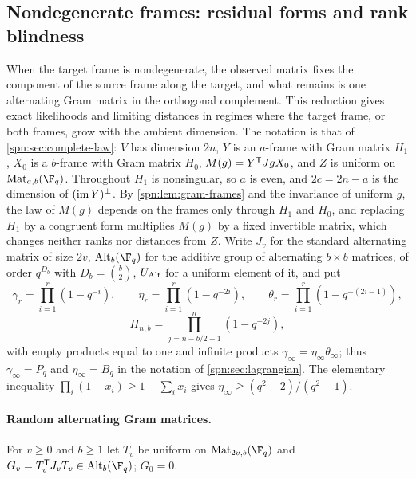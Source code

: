 \subsection{Nondegenerate frames: residual forms and rank blindness}\label{spn:sec:nondegenerate}

When the target frame is nondegenerate, the observed matrix fixes the component of the source
frame along the target, and what remains is one alternating Gram matrix in the orthogonal
complement. This reduction gives exact likelihoods and limiting distances in regimes where the
target frame, or both frames, grow with the ambient dimension. The notation is that of
\cref{spn:sec:complete-law}: $V$ has dimension $2n$, $Y$ is an $a$-frame with Gram matrix $H_1$,
$X_0$ is a $b$-frame with Gram matrix $H_0$, $M(g)=Y^{\mathsf{T}}JgX_0$, and $Z$ is uniform on
$\spnMat_{a,b}(\F_q)$. Throughout $H_1$ is nonsingular, so $a$ is even, and $2c=2n-a$ is the
dimension of $(\operatorname{im} Y)^\perp$. By \cref{spn:lem:gram-frames} and the invariance of uniform $g$,
the law of $M(g)$ depends on the frames only through $H_1$ and $H_0$, and replacing $H_1$ by a
congruent form multiplies $M(g)$ by a fixed invertible matrix, which changes neither ranks nor
distances from $Z$. Write $J_v$ for the standard alternating matrix of size $2v$,
$\spnAlt_b(\F_q)$ for the additive group of alternating $b\times b$ matrices, of order
$q^{D_b}$ with $D_b=\binom b2$, $U_{\operatorname{Alt}}$ for a uniform element of it, and put
\[
 \gamma_r=\prod_{i=1}^r(1-q^{-i}),\qquad
 \eta_r=\prod_{i=1}^r(1-q^{-2i}),\qquad
 \theta_r=\prod_{i=1}^r(1-q^{-(2i-1)}),
\]
\[
 \Pi_{n,b}=\prod_{j=n-b/2+1}^{n}(1-q^{-2j}),
\]
with empty products equal to one and infinite products $\gamma_\infty=\eta_\infty\theta_\infty$;
thus $\gamma_\infty=P_q$ and $\eta_\infty=B_q$ in the notation of \cref{spn:sec:lagrangian}.
The elementary inequality $\prod_i(1-x_i)\ge1-\sum_ix_i$ gives
$\eta_\infty\ge(q^2-2)/(q^2-1)$.

\paragraph{Random alternating Gram matrices.}
For $v\ge0$ and $b\ge1$ let $T_v$ be uniform on $\spnMat_{2v,b}(\F_q)$ and
$G_v=T_v^{\spnT}J_vT_v\in\spnAlt_b(\F_q)$; $G_0=0$.

